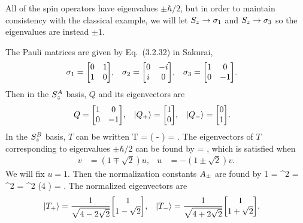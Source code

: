 \begin{solution}
	All of the spin operators have eigenvalues $\pm \hbar/2$, but in order to maintain consistency with the classical example, we will let $S_z \to \sigma_1$ and $S_z \to \sigma_3$ so the eigenvalues are instead $\pm 1$.

	The Pauli matrices are given by Eq.~(3.2.32) in Sakurai,
	\begin{align*}
		\sigq &= \mqty[ 0 & 1 \\ 1 & 0 ], &
		\sigw &= \mqty[ 0 & -i \\ i & 0 ], &
		\sige &= \mqty[ 1 & 0 \\ 0 & -1 ].
	\end{align*}
	Then in the $S_z^A$ basis, $Q$ and its eigenvectors are
	\begin{align*}
		Q &= \mqty[ 1 & 0 \\ 0 & -1 ], &
		\kQp &= \mqty[ 1 \\ 0 ], &
		\kQm &= \mqty[ 0 \\ 1 ].
	\end{align*}
	In the $S_z^B$ basis, $T$ can be written
	\beq
		T =  \left( \mqty[ 1 & 0 \\ 0 & -1 ] - \mqty[ 0 & 1 \\ 1 & 0 ] \right)
		=  \mqty[ 1 & -1 \\ -1 & -1 ].
	\eeq
	The eigenvectors of $T$ corresponding to eigenvalues $\pm \hbar/2$ can be found by
	\beq
		\mqty[ 1 & -1 \\ -1 & -1 ] \mqty[ u \\ v ] = \pm{} \mqty[ u \\ v ],
	\eeq
	which is satisfied when
	\begin{align*}
		v &= (1 \mp \sqrt{2}) u, &
		u &= -(1 \pm \sqrt{2}) v.
	\end{align*}
	We will fix $u = 1$.  Then the normalization constants $A_\pm$ are found by
	\beqn \label{Apm}
		1 = ^2
		= \Apm^2 \mqty[ 1 & 1 \mp \sqrt{2} ] \mqty[ 1 \\ 1 \mp \sqrt{2} ]
		= \Apm^2 (4  )
		\implies
		\Apm = .
	\eeqn
	The normalized eigenvectors are
	\begin{align} \label{Teig}
		\kTp &= \frac{1}{\sqrt{4 - 2 \sqrt{2}}} \mqty[ 1 \\ 1 - \sqrt{2} ], &
		\kTm &= \frac{1}{\sqrt{4 + 2 \sqrt{2}}} \mqty[ 1 \\ 1 + \sqrt{2} ].
	\end{align}
	

\end{solution}

